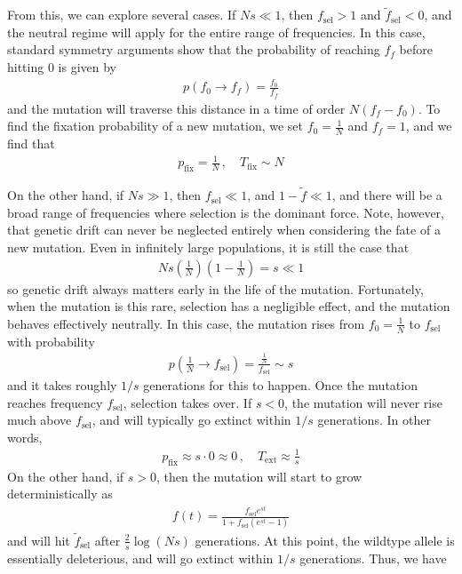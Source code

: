 \documentclass[11pt]{article}
\begin{document}
From this, we can explore several cases. If $Ns \ll 1$, then $f_\mathrm{sel} > 1$ and $\tilde{f}_\mathrm{sel} < 0$, and the neutral regime will apply for the entire range of frequencies. In this case, standard symmetry arguments show that the probability of reaching $f_f$ before hitting $0$ is given by
\begin{align}
p(f_0 \to f_f) = \frac{f_0}{f_f} 
\end{align} 
and the mutation will traverse this distance in a time of order $N (f_f-f_0)$. To find the fixation probability of a new mutation, we set $f_0 = \frac{1}{N}$ and $f_f = 1$, and we find that
\begin{align}
p_\mathrm{fix} = \frac{1}{N} \, , \quad T_\mathrm{fix} \sim N
\end{align}

On the other hand, if $Ns \gg 1$, then $f_\mathrm{sel} \ll 1$, and $1-\tilde{f} \ll 1$, and there will be a broad range of frequencies where selection is the dominant force. Note, however, that genetic drift can never be neglected entirely when considering the fate of a new mutation. Even in infinitely large populations, it is still the case that
\begin{align}
Ns \left( \frac{1}{N} \right) \left( 1 -  \frac{1}{N} \right)  = s \ll 1
\end{align}
so genetic drift always matters early in the life of the mutation. Fortunately, when the mutation is this rare, selection has a negligible effect, and the mutation behaves effectively neutrally. In this case, the mutation rises from $f_0 = \frac{1}{N}$ to $f_\mathrm{sel}$ with probability
\begin{align}
p\left( \frac{1}{N} \to f_\mathrm{sel} \right) = \frac{\frac{1}{N}}{f_\mathrm{sel}} \sim s 
\end{align}
and it takes roughly $1/s$ generations for this to happen. Once the mutation reaches frequency $f_\mathrm{sel}$, selection takes over. If $s < 0$, the mutation will never rise much above $f_\mathrm{sel}$, and will typically go extinct within $1/s$ generations. In other words,
\begin{align}
p_\mathrm{fix} \approx s \cdot 0 \approx 0 \, , \quad T_\mathrm{ext} \approx \frac{1}{s} 
\end{align}
On the other hand, if $s > 0$, then the mutation will start to grow deterministically as
\begin{align}
f(t) = \frac{f_\mathrm{sel} e^{st}}{1+f_\mathrm{sel} ( e^{st} - 1)} 
\end{align} 
and will hit $\tilde{f}_\mathrm{sel}$ after $\frac{2}{s} \log \left( Ns \right)$ generations. At this point, the wildtype allele is essentially deleterious, and will go extinct within $1/s$ generations. Thus, we have
\end{document}
